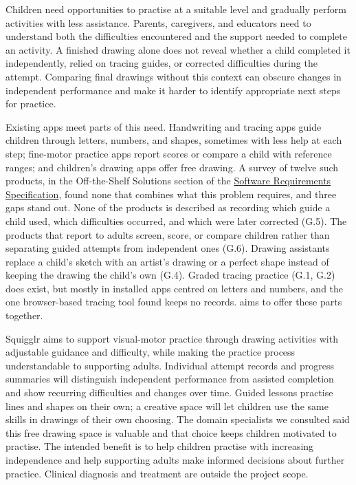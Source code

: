 \documentclass{article}
\begin{document}
Children need opportunities to practise at a suitable level and gradually
perform activities with less assistance. Parents, caregivers, and
educators need to understand both the difficulties encountered and the
support needed to complete an activity. A finished drawing alone does
not reveal whether a child completed it independently, relied on tracing
guides, or corrected difficulties during the attempt. Comparing final
drawings without this context can obscure changes in independent
performance and make it harder to identify appropriate next steps for
practice.

Existing apps meet parts of this need. Handwriting and tracing apps guide
children through letters, numbers, and shapes, sometimes with less help at
each step; fine-motor practice apps report scores or compare a child with
reference ranges; and children's drawing apps offer free drawing. A survey of
twelve such products, in the Off-the-Shelf Solutions section of the
\href{https://github.com/AHMEDELZARIA/squigglr/blob/main/pdfs/SRS/SRS.pdf}{Software
Requirements Specification}, found none that combines what this problem
requires, and three gaps stand out. None of the products is described as
recording which guide a child used, which difficulties occurred, and which
were later corrected (G.5). The products that report to adults screen, score,
or compare children rather than separating guided attempts from independent
ones (G.6). Drawing assistants replace a child's sketch with an artist's
drawing or a perfect shape instead of keeping the drawing the child's own
(G.4). Graded tracing practice (G.1, G.2) does exist, but mostly in installed
apps centred on letters and numbers, and the one browser-based tracing tool
found keeps no records. \progname{} aims to offer these parts together.

Squigglr aims to support visual-motor practice through drawing activities
with adjustable guidance and difficulty, while making the practice
process understandable to supporting adults. Individual attempt records
and progress summaries will distinguish independent performance from
assisted completion and show recurring difficulties and changes over
time. Guided lessons practise lines and shapes on their own; a creative
space will let children use the same skills in drawings of their own
choosing. The domain specialists we consulted said this free drawing
space is valuable and that choice keeps children motivated to practise.
The intended benefit is to help children
practise with increasing independence and help supporting adults make
informed decisions about further practice. Clinical diagnosis and
treatment are outside the project scope.
\end{document}
